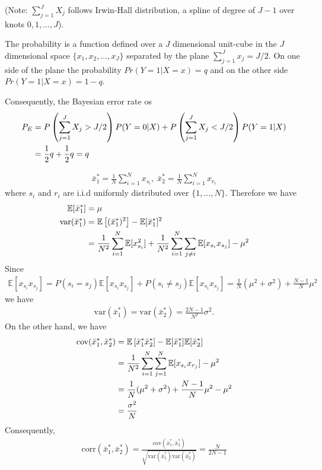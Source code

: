 \begin{exercise}
  (Note: $\sum_{j=1}^JX_j$ follows Irwin-Hall distribution, a spline of degree
  of $J-1$ over knots $0,1,\ldots,J$).
  
  The probability is a function defined over a $J$ dimensional unit-cube in the
  $J$ dimensional space $\{x_1, x_2,\ldots,x_J\}$ separated by the plane
  $\sum_{j=1}^Jx_j = J / 2$. On one side of the plane the probability
  $Pr(Y=1|X=x) = q$ and on the other side $Pr(Y=1|X=x) = 1 - q$.
  
  Consequently, the Bayesian error rate os
  \begin{align}
    P_E & = P\left(\sum_{j=1}^JX_j > J/2\right)P(Y = 0|X) +
    P\left(\sum_{j=1}^JX_j < J/2\right)P(Y = 1|X) \notag\\
    & = \frac{1}{2}q + \frac{1}{2}q = q
  \end{align}
\end{exercise}

\begin{exercise}
  \begin{align}
    \bar{x}_1^*  = \frac{1}{N}\sum_{i=1}^Nx_{s_i},\;  \bar{x}_2^* =
    \frac{1}{N}\sum_{i=1}^Nx_{r_i}
  \end{align}
  where $s_i$ and $r_i$ are i.i.d uniformly distributed over $\{1,\ldots,N\}$.
  Therefore we have
  \begin{align}
    \mathbb{E}[\bar{x}_1^*] & = \mu \\
    \mbox{var}(\bar{x}_1^*) & = \mathbb{E}\left[(\bar{x}_1^*)^2\right] -
    \mathbb{E}[\bar{x}_1^*]^2 \notag \\
    &= \frac{1}{N^2}\sum_{i=1}^N\mathbb{E}[x_{s_i}^2] +
    \frac{1}{N^2} \sum_{i=1}^N \sum_{j\not=i}\mathbb{E}[x_{s_i}x_{s_j}] - \mu^2
  \end{align}
  Since
  \begin{align}
    \mathbb{E}[x_{s_i}x_{s_j}] = P(s_i = s_j)\mathbb{E}[x_{s_i}x_{s_j}] + P(s_i \not=
    s_j)\mathbb{E}[x_{s_i}x_{s_j}] = \frac{1}{N}(\mu^2 + \sigma^2) +
    \frac{N-1}{N}\mu^2
  \end{align}
  we have
  \begin{align}
    \mbox{var}(\bar{x}_1^*) = \mbox{var}(\bar{x}_2^*) =
    \frac{2N-1}{N^2}\sigma^2.
  \end{align}
  On the other hand, we have
  \begin{align}
    \mbox{cov}(\bar{x}_1^*, \bar{x}_2^*) &=
    \mathbb{E}\left[\bar{x}_1^*\bar{x}_2^*\right] -
    \mathbb{E}[\bar{x}_1^*]\mathbb{E}[\bar{x}_2^*] \notag \\
    &= \frac{1}{N^2}\sum_{i=1}^N \sum_{j=1}^N \mathbb{E}[x_{s_i}x_{r_j}] - \mu^2
    \notag\\
    &= \frac{1}{N}(\mu^2 + \sigma^2) + \frac{N-1}{N}\mu^2 - \mu^2 \notag \\
    &= \frac{\sigma^2}{N}
  \end{align}
  Consequently,
  \begin{align}
    \mbox{corr}(\bar{x}_1^*, \bar{x}_2^*) = \frac{\mbox{cov}(\bar{x}_1^*,
    \bar{x}_2^*)}{\sqrt{\mbox{var}(\bar{x}_1^*)\mbox{var}(\bar{x}_2^*)}} =
    \frac{N}{2N-1}
  \end{align}
\end{exercise}

